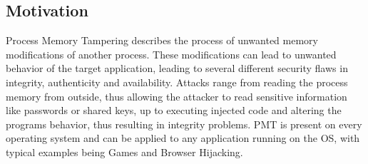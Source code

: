 \subsection{Motivation}
Process Memory Tampering describes the process of unwanted memory modifications of another process. These modifications can lead to unwanted behavior of the target application, leading to several different security flaws in integrity, authenticity and availability. Attacks range from reading the process memory from outside, thus allowing the attacker to read sensitive information like passwords or shared keys, up to executing injected code and altering the programs behavior, thus resulting in integrity problems. PMT is present on every operating system and can be applied to any application running on the OS, with typical examples being Games and Browser Hijacking.

